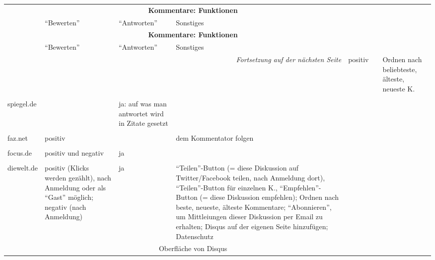 \begin{landscape} \footnotesize
  \begin{longtable}{l|p{40mm}p{40mm}p{80mm}}

  & \multicolumn{3}{c}{\bfseries Kommentare: Funktionen} \\
  & ``Bewerten'' & ``Antworten'' & Sonstiges \\\hline
  \endfirsthead

  & \multicolumn{3}{c}{\bfseries Kommentare: Funktionen} \\
  & ``Bewerten'' & ``Antworten'' & Sonstiges \\\hline
  \endhead

  \hline \multicolumn{4}{r}{\emph{Fortsetzung auf der nächsten Seite}}
  \endfoot

  \hline
  \endlastfoot


\hline

  bild.de &
    positiv & & Ordnen nach beliebteste, älteste, neueste K.\\
    & \multicolumn{3}{c}{}\\\hline

  spiegel.de &
  & ja: auf was man antwortet wird in Zitate gesetzt & \\
  & \multicolumn{3}{c}{}\\\hline

  faz.net & positiv & & dem Kommentator folgen \\
          & \multicolumn{3}{c}{}\\\hline

  focus.de & positiv und negativ & ja & \\
           & \multicolumn{3}{c}{}\\\hline

  diewelt.de &
    positiv (Klicks werden gezählt), nach Anmeldung oder als ``Gast'' möglich;
    negativ (nach Anmeldung) &
    ja &
    ``Teilen''-Button (= diese Diskussion auf Twitter/Facebook teilen, nach
    Anmeldung dort), ``Teilen''-Button für einzelnen K., ``Empfehlen''-Button (=
    diese Diskussion empfehlen); Ordnen nach beste, neueste, älteste Kommentare;
    ``Abonnieren'', um Mittleiungen dieser Diskussion per Email zu erhalten;
    Disqus auf der eigenen Seite hinzufügen; Datenschutz\\
    & \multicolumn{3}{c}{Oberfläche von Disqus}\\\hline


\end{longtable}
\end{landscape}
